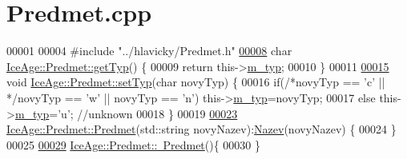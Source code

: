 \hypertarget{Predmet_8cpp_source}{}\section{Predmet.\+cpp}
\label{Predmet_8cpp_source}

\begin{DoxyCode}
00001 
00004 \textcolor{preprocessor}{#include "../hlavicky/Predmet.h"}
\hypertarget{Predmet_8cpp_source.tex_l00008}{}\hyperlink{classIceAge_1_1Predmet_a90491592ba559e5b276b672633795e29}{00008} \textcolor{keywordtype}{char} \hyperlink{classIceAge_1_1Predmet_a90491592ba559e5b276b672633795e29}{IceAge::Predmet::getTyp}() \{
00009     \textcolor{keywordflow}{return} this->\hyperlink{classIceAge_1_1Predmet_a3fe2c66d9696c90e46885f41a19fd9af}{m\_typ};
00010 \}
00011 
\hypertarget{Predmet_8cpp_source.tex_l00015}{}\hyperlink{classIceAge_1_1Predmet_af69bf7c4e8cb75493c90deeaa2afd03c}{00015} \textcolor{keywordtype}{void} \hyperlink{classIceAge_1_1Predmet_af69bf7c4e8cb75493c90deeaa2afd03c}{IceAge::Predmet::setTyp}(\textcolor{keywordtype}{char} novyTyp) \{
00016     \textcolor{keywordflow}{if}(\textcolor{comment}{/*novyTyp == 'c' || */}novyTyp == \textcolor{charliteral}{'w'} || novyTyp == \textcolor{charliteral}{'n'}) this->\hyperlink{classIceAge_1_1Predmet_a3fe2c66d9696c90e46885f41a19fd9af}{m\_typ}=novyTyp;
00017     \textcolor{keywordflow}{else} this->\hyperlink{classIceAge_1_1Predmet_a3fe2c66d9696c90e46885f41a19fd9af}{m\_typ}=\textcolor{charliteral}{'u'}; \textcolor{comment}{//unknown}
00018 \}
00019 
\hypertarget{Predmet_8cpp_source.tex_l00023}{}\hyperlink{classIceAge_1_1Predmet_a9926e099eb9fa9e7b0e6dbc57c70da8c}{00023} \hyperlink{classIceAge_1_1Predmet_a9926e099eb9fa9e7b0e6dbc57c70da8c}{IceAge::Predmet::Predmet}(std::string novyNazev):\hyperlink{classIceAge_1_1Nazev}{Nazev}(novyNazev) \{
00024 \}
00025 
\hypertarget{Predmet_8cpp_source.tex_l00029}{}\hyperlink{classIceAge_1_1Predmet_a5d1df42cff0edd79e2a3990535ae86da}{00029} \hyperlink{classIceAge_1_1Predmet_a5d1df42cff0edd79e2a3990535ae86da}{IceAge::Predmet::~Predmet}()\{
00030 \}
\end{DoxyCode}
